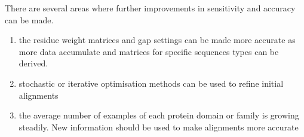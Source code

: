 There are several areas where further improvements in sensitivity and accuracy can be made.
\begin{enumerate}
\item the residue weight matrices and gap settings can be made more accurate as more data accumulate and matrices for specific sequences types can be derived.
\item stochastic or iterative optimisation methods can be used to refine initial alignments
\item the average number of examples of each protein domain or family is growing steadily. New information should be used to make alignments more accurate
\end{enumerate}
